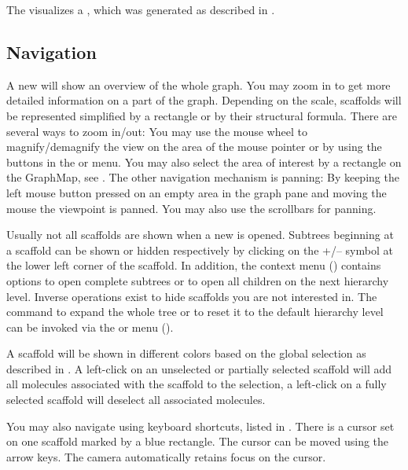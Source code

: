 The \stview visualizes a \stree, which was generated as described in 
. 

\subsection{Navigation}
A new \stview will show an overview of the whole graph. You may zoom in to get
more detailed information on a part of the graph. Depending on the scale,
scaffolds will be represented simplified by a rectangle or by their structural
formula. There are several ways to zoom in/out: You may use the mouse wheel to
magnify/demagnify the view on the area of the mouse pointer or by using the
buttons in the \tbar or  menu. You may also select the area of
interest by a rectangle on the GraphMap, see
. The other navigation mechanism is
panning: By keeping the left mouse button pressed on an empty area in the graph
pane and moving the mouse the viewpoint is panned. You may also use the
scrollbars for panning.

Usually not all scaffolds are shown when a new \stview is opened. Subtrees
beginning at a scaffold can be shown or hidden respectively by clicking on the
+/-- symbol at the lower left corner of the scaffold. In addition, the context menu
() contains options to open complete
subtrees or to open all children on the next hierarchy level. Inverse operations
exist to hide scaffolds you are not interested in. The command to expand the
whole tree or to reset it to the default hierarchy level can be invoked via the
\tbar or   menu ().

A scaffold will be shown in different colors based on the global selection as
described in . A left-click on an unselected or
partially selected scaffold will add all molecules associated with the scaffold
to the selection, a left-click on a fully selected scaffold will deselect all
associated molecules.

You may also navigate using keyboard shortcuts, listed in
. There is a cursor set on one scaffold
marked by a blue rectangle. The cursor can be  moved using the arrow keys. The
camera automatically retains focus on the cursor.


